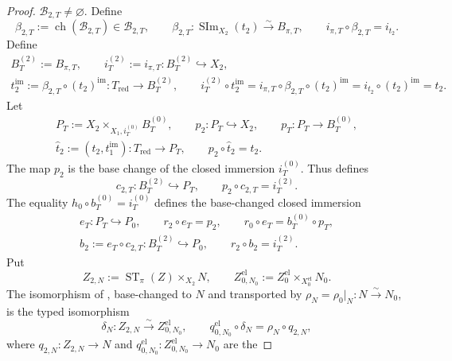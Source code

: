 \begin{proof}
  $\mathscr B_{2,T}\ne\varnothing$.  Define
  \[
    \beta_{2,T}:=\operatorname{ch}(\mathscr B_{2,T})
      \in\mathscr B_{2,T},
    \qquad
    \beta_{2,T}\colon\operatorname{SIm}_{X_2}(t_2)
      \xrightarrow{\sim}B_{\pi,T},
    \qquad
    i_{\pi,T}\circ\beta_{2,T}=i_{t_2}.                         \tag{IC5a}
  \]
  Define
  \[
  \begin{gathered}
    B_T^{(2)}:=B_{\pi,T},
    \qquad
    i_T^{(2)}:=i_{\pi,T}\colon B_T^{(2)}\hookrightarrow X_2,\\
    t_2^{\mathrm{im}}:=\beta_{2,T}\circ(t_2)^{\mathrm{im}}
      \colon T_{\mathrm{red}}\to B_T^{(2)},
    \qquad
    i_T^{(2)}\circ t_2^{\mathrm{im}}
      =i_{\pi,T}\circ\beta_{2,T}\circ(t_2)^{\mathrm{im}}
      =i_{t_2}\circ(t_2)^{\mathrm{im}}=t_2.
  \end{gathered}
  \]
  Let
  \[
  \begin{gathered}
    P_T:=X_2\times_{X_1,i_T^{(0)}}B_T^{(0)},
    \qquad
    p_2\colon P_T\hookrightarrow X_2,
    \qquad
    p_T\colon P_T\to B_T^{(0)},\\
    \widehat t_2:=(t_2,t_1^{\mathrm{im}})
      \colon T_{\mathrm{red}}\to P_T,
    \qquad
    p_2\circ\widehat t_2=t_2.
  \end{gathered}
  \]
  The map $p_2$ is the base change of the closed immersion $i_T^{(0)}$.
  Thus  defines
  \[
    c_{2,T}\colon B_T^{(2)}\hookrightarrow P_T,
    \qquad
    p_2\circ c_{2,T}=i_T^{(2)}.
  \]
  The equality $h_0\circ b_T^{(0)}=i_T^{(0)}$ defines the base-changed
  closed immersion
  \[
  \begin{gathered}
    e_T\colon P_T\hookrightarrow P_0,
    \qquad
    r_2\circ e_T=p_2,
    \qquad
    r_0\circ e_T=b_T^{(0)}\circ p_T,\\
    b_2:=e_T\circ c_{2,T}\colon B_T^{(2)}\hookrightarrow P_0,
    \qquad
    r_2\circ b_2=i_T^{(2)}.
  \end{gathered}
  \]
  Put
  \[
    Z_{2,N}:=\operatorname{ST}_\pi(Z)\times_{X_2}N,\qquad
    Z^{\mathrm{el}}_{0,N_0}:=
      Z_0^{\mathrm{el}}\times_{X_0^{\mathrm{el}}}N_0.
  \]
  The isomorphism of
  , base-changed to $N$ and
    transported by $\rho_N=\rho_0|_N\colon N\xrightarrow{\sim}N_0$, is the typed
  isomorphism
  \[
    \delta_N\colon Z_{2,N}\xrightarrow{\sim}Z^{\mathrm{el}}_{0,N_0},
    \qquad
    q^{\mathrm{el}}_{0,N_0}\circ\delta_N
      =\rho_N\circ q_{2,N},
  \]
  where $q_{2,N}\colon Z_{2,N}\to N$ and
  $q^{\mathrm{el}}_{0,N_0}\colon Z^{\mathrm{el}}_{0,N_0}\to N_0$ are the

\end{proof}
